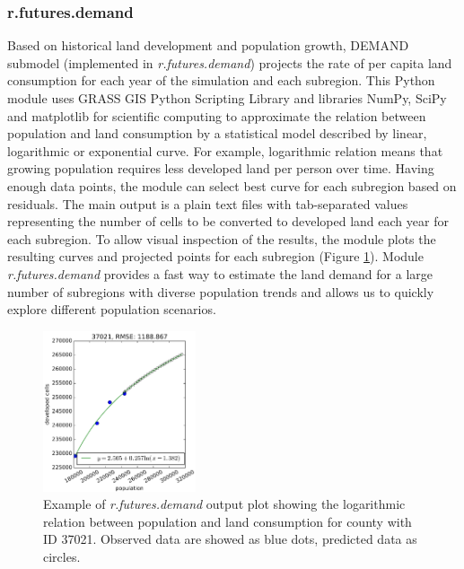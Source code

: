 \documentclass{isprs}
\begin{document}
\subsubsection{r.futures.demand}
Based on historical land development and population growth, DEMAND submodel 
(implemented in \emph{r.futures.demand})
projects the rate of per capita land consumption for each year of the simulation
and each subregion. This Python module uses GRASS GIS Python Scripting
Library and libraries NumPy, SciPy and matplotlib for scientific computing
to approximate the relation between population and land consumption
by a statistical model described by linear, logarithmic or exponential curve.
For example, logarithmic relation means that growing population requires
less developed land per person over time.
Having enough data points, the module
can select best curve for each subregion based on residuals.
The main output is a plain text files with tab-separated values
representing the number of cells to be converted to developed land each year for each subregion.
To allow visual inspection of the results, the module
plots the resulting curves and projected points for each subregion (Figure \ref{fig:demand}).
Module \emph{r.futures.demand} provides a fast way to estimate
the land demand for a large number of subregions with diverse population
trends and allows us to quickly explore different population scenarios.

\begin{figure}[h!]
 \centering
 \includegraphics[width=0.4\textwidth]{./figures/plot_demand.pdf}
 \caption{Example of \emph{r.futures.demand} output plot showing
 the logarithmic relation between population and land consumption
 for county with ID 37021.
 Observed data are showed as blue dots, predicted data as circles.
 }
 \label{fig:demand}
\end{figure}
\end{document}
